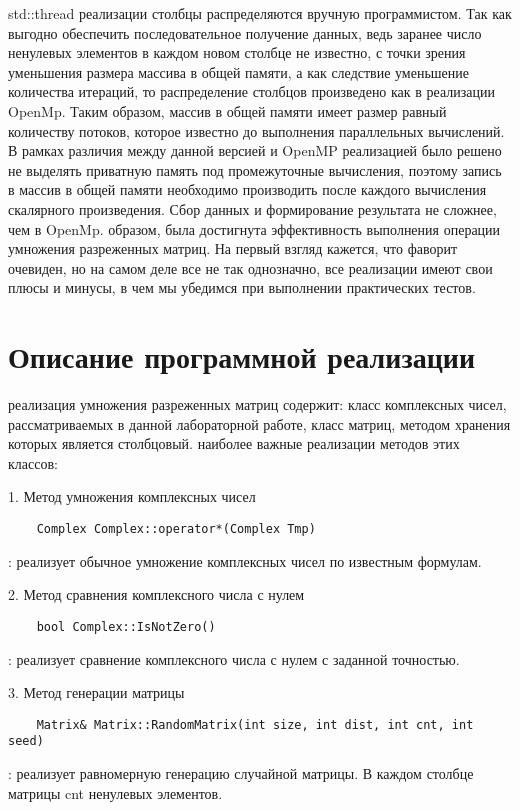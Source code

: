 \documentclass{report}
\begin{document}
 std::thread реализации столбцы распределяются вручную программистом. Так как выгодно обеспечить последовательное получение данных, ведь заранее число ненулевых элементов в каждом новом столбце не известно, с точки зрения уменьшения размера массива в общей памяти, а как следствие уменьшение количества итераций, то распределение столбцов произведено как в реализации OpenMp. Таким образом, массив в общей памяти имеет размер равный количеству потоков, которое известно до выполнения параллельных вычислений. В рамках различия между данной версией и OpenMP реализацией было решено не выделять приватную память под промежуточные вычисления, поэтому запись в массив в общей памяти необходимо производить после каждого вычисления скалярного произведения. Сбор данных и формирование результата не сложнее, чем в OpenMp.
 образом, была достигнута эффективность выполнения операции \\
умножения разреженных матриц. На первый взгляд кажется, что фаворит очевиден, но на самом деле все не так однозначно, все реализации имеют свои плюсы и минусы, в чем мы убедимся при выполнении практических тестов.

\newpage

\section*{Описание программной реализации}
 реализация умножения разреженных матриц содержит: класс комплексных чисел, рассматриваемых в данной лабораторной работе, класс матриц, методом хранения которых является столбцовый.
 наиболее важные реализации методов этих классов:
\par 1. Метод умножения комплексных чисел
\begin{lstlisting}
    Complex Complex::operator*(Complex Tmp)
\end{lstlisting}
: реализует обычное умножение комплексных чисел по известным формулам.

\par 2. Метод сравнения комплексного числа с нулем
\begin{lstlisting}
    bool Complex::IsNotZero()
\end{lstlisting}
: реализует сравнение комплексного числа с нулем с заданной точностью.

\par 3. Метод генерации матрицы
\begin{lstlisting}
    Matrix& Matrix::RandomMatrix(int size, int dist, int cnt, int seed)
\end{lstlisting}
: реализует равномерную генерацию случайной матрицы. В каждом столбце матрицы cnt ненулевых элементов.
\end{document}

